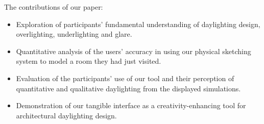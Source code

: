 \documentclass[review]{vgtc}                 %
\begin{document}
%
%
%

\noindent
The contributions of our paper: \vspace{-0.1in}

\begin{itemize}


\item Exploration of participants' fundamental understanding of
  daylighting design, overlighting, underlighting and glare.\vspace{-0.1in}

\item Quantitative analysis of the users' accuracy in using our
  physical sketching system to model a room they had just visited.\vspace{-0.1in}

\item Evaluation of the participants' use of our tool and their
  perception of quantitative and qualitative daylighting from the 
  displayed simulations.\vspace{-0.1in}

\item Demonstration of our tangible interface as a
  creativity-enhancing tool for architectural daylighting design.


\end{itemize}


\end{document}
